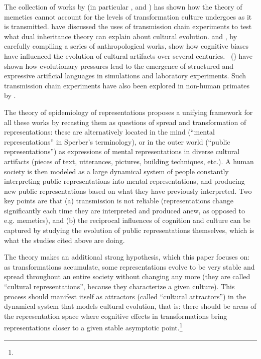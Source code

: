 \begin{new}
The collection of works by \citet{aunger_darwinizing_2000} (in particular \citealp{bloch_well-disposed_2000}, and \citealp{kuper_if_2000}) has shown how the theory of memetics cannot account for the levels of transformation culture undergoes as it is transmitted.
 have discussed the uses of transmission chain experiments to test what dual inheritance theory can explain about cultural evolution.
 and \citet{miton_universal_2015}, by carefully compiling a series of anthropological works, show how cognitive biases have influenced the evolution of cultural artifacts over several centuries.
\citeauthor{kirby_cumulative_2008}~(\citeyear{kirby_cumulative_2008,cornish_systems_2013}) have shown how evolutionary pressures lead to the emergence of structured and expressive artificial languages in simulations and laboratory experiments.
Such transmission chain experiments have also been explored in non-human primates by \citet{claidiere_cultural_2014}.

The theory of epidemiology of representations proposes a unifying framework for all these works by recasting them as questions of spread and transformation of representations:
these are alternatively located in the mind (``mental representations'' in Sperber's terminology), or in the outer world (``public representations'') as expressions of mental representations in diverse cultural artifacts (pieces of text, utterances, pictures, building techniques, etc.).
A human society is then modeled as a large dynamical system of people constantly interpreting public representations into mental representations, and producing new public representations based on what they have previously interpreted.
Two key points are that (a) transmission is not reliable (representations change significantly each time they are interpreted and produced anew, as opposed to \hbox{e.g.} memetics), and (b) the reciprocal influences of cognition and culture can be captured by studying the evolution of public representations themselves, which is what the studies cited above are doing.

The theory makes an additional strong hypothesis, which this paper focuses on:
as transformations accumulate, some representations evolve to be very stable and spread throughout an entire society without changing any more (they are called ``cultural representations'', because they characterize a given culture).
This process should manifest itself as attractors (called ``cultural attractors'') in the dynamical system that models cultural evolution, that is:
there should be areas of the representation space where cognitive effects in transformations bring representations closer to a given stable asymptotic point.\footnote{
}


\end{new}
